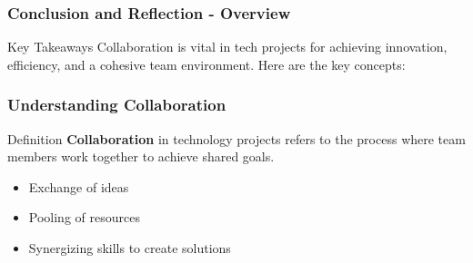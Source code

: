 \documentclass[aspectratio=169]{beamer}
\begin{document}
\begin{frame}[fragile]
    \frametitle{Conclusion and Reflection - Overview}
    \begin{block}{Key Takeaways}
        Collaboration is vital in tech projects for achieving innovation, efficiency, and a cohesive team environment. Here are the key concepts:
    \end{block}
\end{frame}

\begin{frame}[fragile]
    \frametitle{Understanding Collaboration}
    \begin{block}{Definition}
        \textbf{Collaboration} in technology projects refers to the process where team members work together to achieve shared goals. 
    \end{block}
    
    \begin{itemize}
        \item Exchange of ideas
        \item Pooling of resources
        \item Synergizing skills to create solutions
    \end{itemize}
\end{frame}
\end{document}
